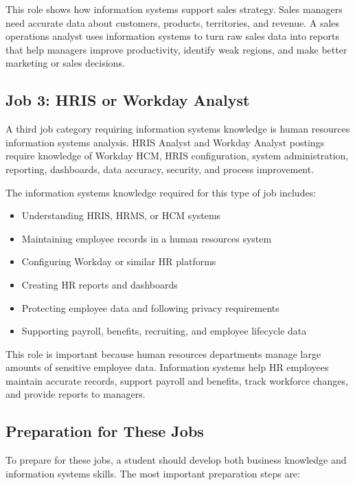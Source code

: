 \documentclass[12pt]{article}
\begin{document}
This role shows how information systems support sales strategy. Sales managers
need accurate data about customers, products, territories, and revenue. A sales
operations analyst uses information systems to turn raw sales data into reports
that help managers improve productivity, identify weak regions, and make better
marketing or sales decisions.


\subsection{Job 3: HRIS or Workday Analyst}

A third job category requiring information systems knowledge is human resources
information systems analysis. HRIS Analyst and Workday Analyst postings require
knowledge of Workday HCM, HRIS configuration, system administration, reporting,
dashboards, data accuracy, security, and process improvement.

The information systems knowledge required for this type of job includes:

\begin{itemize}
    \item Understanding HRIS, HRMS, or HCM systems
    \item Maintaining employee records in a human resources system
    \item Configuring Workday or similar HR platforms
    \item Creating HR reports and dashboards
    \item Protecting employee data and following privacy requirements
    \item Supporting payroll, benefits, recruiting, and employee lifecycle data
\end{itemize}

This role is important because human resources departments manage large amounts
of sensitive employee data. Information systems help HR employees maintain
accurate records, support payroll and benefits, track workforce changes, and
provide reports to managers.


\subsection{Preparation for These Jobs}

To prepare for these jobs, a student should develop both business knowledge and
information systems skills. The most important preparation steps are:
\end{document}
